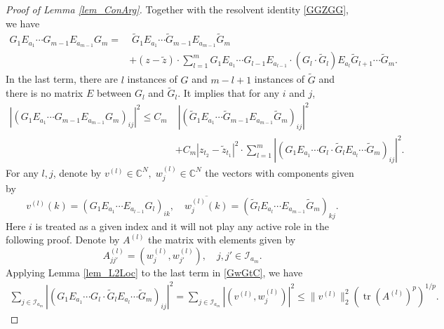\documentclass[10pt,reqno]{article}
\theoremstyle{plain} %
\theoremstyle{remark}
\numberwithin{equation}{section}
\begin{document}
\begin{proof}[Proof of Lemma \ref{lem_ConArg}]
Together with  the resolvent identity \eqref{GGZGG}, we have
\begin{align}
        G_1 E_{a_1} \cdots G_{m-1} E_{a_{m-1}} G_m = & \; \widetilde{G}_1 E_{a_1} \cdots \widetilde{G}_{m-1} E_{a_{m-1}} \widetilde{G}_m 
        \nonumber \\
        & + (z - \widetilde{z}) \cdot \sum_{l=1}^m G_1 E_{a_1} \cdots G_{l-1} E_{a_{l-1}} \cdot \left( G_l \cdot \widetilde{G}_l\right)
        E_{a_l} \widetilde{G}_{l+1} \cdots \widetilde{G}_m.
\end{align}
In the last term, there are \( l \) instances of \( G \) and \( m - l + 1 \) instances of \( \widetilde{G} \)
and there is no matrix $E$ between $G_l$ and $\widetilde{G}_l$. 
It implies that for any $i$ and $j$,
    \begin{align}\label{GwGtC}
        \left| \left( G_1 E_{a_1} \cdots G_{m-1} E_{a_{m-1}} G_m \right)_{ij} \right|^2 \le C_m & \;
        \left| \left( \widetilde{G}_1 E_{a_1} \cdots \widetilde{G}_{m-1} E_{a_{m-1}} \widetilde{G}_m \right)_{ij} \right|^2 \nonumber \\
        & + C_m \left|z_{t_2} - \widetilde{z}_{t_1}\right|^2 \cdot \sum_{l=1}^m \left| \left( G_1 E_{a_1} \cdots G_l \cdot \widetilde{G}_l E_{a_l} \cdots \widetilde{G}_m \right)_{ij} \right|^2.
    \end{align}
For any  $l, j$, denote by $ v^{(l)} \in \mathbb C^{N}, \; w^{(l)}_j\in \mathbb C^{N}$  the vectors with components given by  
$$
    v^{(l)}(k) = \left( G_1 E_{a_1} \cdots E_{a_{l-1}} G_l \right)_{ik}, \quad 
   \overline{  w^{(l)}_j(k)} = \left( \widetilde{G}_l E_{a_l} \cdots E_{a_{m-1}} \widetilde{G}_m \right)_{kj}.
$$
Here $i$ is treated as a given  index and it will not play any active role in the following proof. Denote by  $A^{(l)}$   the matrix with  elements given by 
$$
    A^{(l)}_{jj'} = \left( w^{(l)}_j, w^{(l)}_{j'} \right), \quad j, j' \in \mathcal{I}_{a_m}.
$$
Applying Lemma \ref{lem_L2Loc} to the last term in \eqref{GwGtC}, we have 
\begin{align}\label{jziwmas}
      \sum_{j \in \mathcal{I}_{a_m}} \left| \left( G_1 E_{a_1} \cdots G_l \cdot \widetilde{G}_l E_{a_l} \cdots \widetilde{G}_m \right)_{ij} \right|^2
    = \sum_{j \in \mathcal{I}_{a_m}} \left| \left( v^{(l)}, w^{(l)}_j \right)\right|^2
    \le \|v^{(l)}\|_2^2 \left( \operatorname{tr} \left( A^{(l)} \right)^p \right)^{1/p}.  
\end{align}
 

\end{proof}
\end{document}
